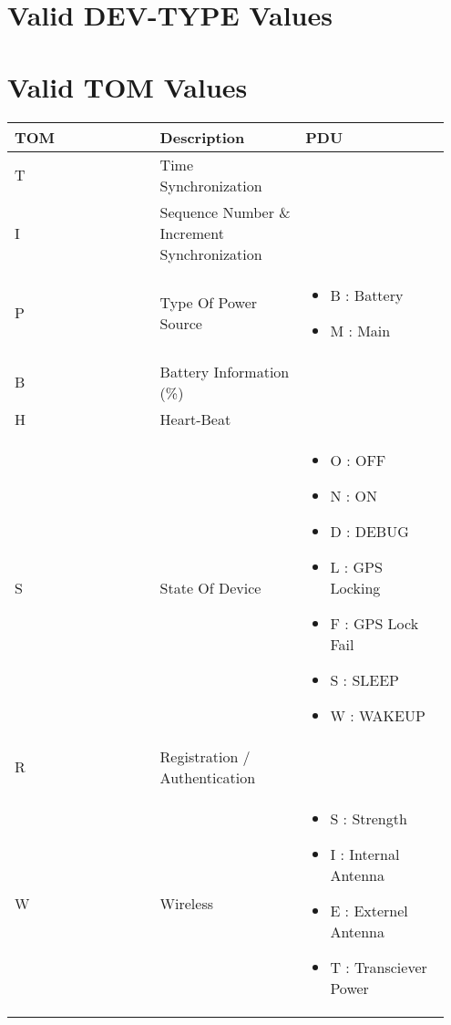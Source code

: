 \documentclass[letterpaper,10pt,english]{sphinxmanual}
\begin{document}
\section{Valid DEV-TYPE Values}
\label{week-11-12:valid-dev-type-values}

\section{Valid TOM Values}
\label{week-11-12:valid-tom-values}
\begin{tabular}{|p{0.317\linewidth}|p{0.317\linewidth}|p{0.317\linewidth}|}
\hline
\textsf{\relax 
TOM
} & \textsf{\relax 
Description
} & \textsf{\relax 
PDU
}\\
\hline
T
 & 
Time Synchronization
 & \\
\hline
I
 & 
Sequence Number \& Increment Synchronization
 & \\
\hline
P
 & 
Type Of Power Source
 & \begin{itemize}
\item {} 
B : Battery

\item {} 
M : Main

\end{itemize}
\\
\hline
B
 & 
Battery Information (\%)
 & \\
\hline
H
 & 
Heart-Beat
 & \\
\hline
S
 & 
State Of Device
 & \begin{itemize}
\item {} 
O : OFF

\item {} 
N : ON

\item {} 
D : DEBUG

\item {} 
L : GPS Locking

\item {} 
F : GPS Lock Fail

\item {} 
S : SLEEP

\item {} 
W : WAKEUP

\end{itemize}
\\
\hline
R
 & 
Registration / Authentication
 & \\
\hline
W
 & 
Wireless
 & \begin{itemize}
\item {} 
S : Strength

\item {} 
I : Internal Antenna

\item {} 
E : Externel Antenna

\item {} 
T : Transciever Power

\end{itemize}
\\
\hline\end{tabular}
\end{document}
